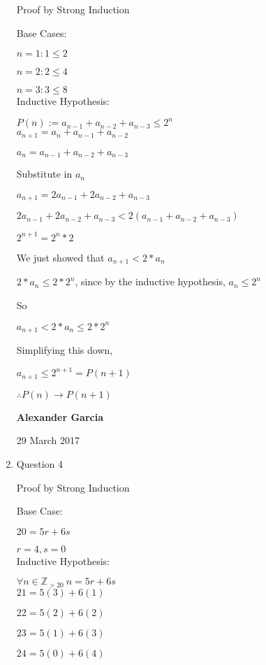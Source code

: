 \documentclass[11pt]{article}
\begin{document}
\begin{enumerate}
		Proof by Strong Induction

		Base Cases:

		$n = 1: 1 \leq 2$

		$n = 2: 2 \leq 4$

		$n = 3: 3 \leq 8$ \\

		Inductive Hypothesis:

		$P(n):= a_{n-1}+a_{n-2}+a_{n-3} \leq 2^n$ \\

		$a_{n+1} = a_n + a_{n-1} + a_{n-2}$

		$a_n = a_{n-1} + a_{n-2} + a_{n-3}$

		Substitute in $a_n$

		$a_{n+1} = 2a_{n-1} + 2a_{n-2} + a_{n-3}$

		$2a_{n-1} + 2a_{n-2} + a_{n-3} <
		2(a_{n-1} + a_{n-2} + a_{n-3})$

		$2^{n+1} = 2^n * 2$

		We just showed that $a_{n+1} < 2*a_n$

		$2*a_n \leq 2*2^n$, since by the inductive
		hypothesis, $a_n \leq 2^n$

		So

		$a_{n+1} < 2*a_n \leq 2*2^n$

		Simplifying this down,

		$a_{n+1} \leq 2^{n+1} = P(n+1)$

		$\therefore P(n) \rightarrow P(n+1)$

		\newpage

		\textbf{Alexander Garcia}

		29 March 2017 \\

	\item Question 4

		Proof by Strong Induction

		Base Case:

		$20 = 5r + 6s$

		$r = 4, s = 0$ \\

		Inductive Hypothesis:

		$\forall n \in \mathbb{Z}_{>20}\ n = 5r + 6s$ \\

		$21 = 5(3) + 6(1)$

		$22 = 5(2) + 6(2)$

		$23 = 5(1) + 6(3)$

		$24 = 5(0) + 6(4)$


\end{enumerate}
\end{document}
